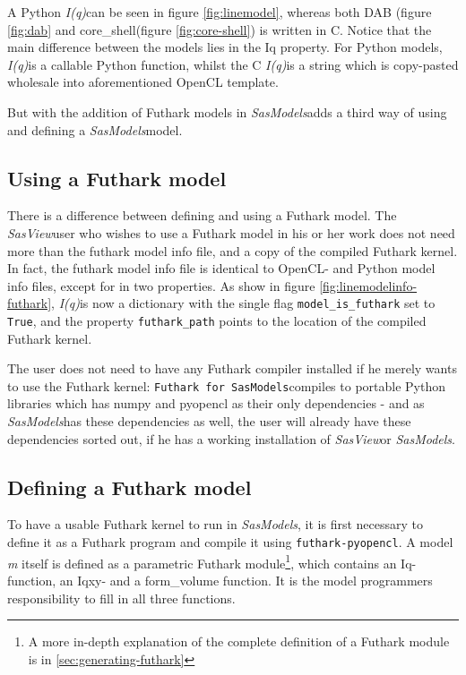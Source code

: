 \documentclass[11pt]{article}
\newcommand{\sasmodels}{\textit{SasModels}}
\newcommand{\sasview}{\textit{SasView}}
\newcommand{\iq}{\textit{I(q)}}
\newcommand{\futhark}{\texttt{Futhark for SasModels}}
\begin{document}
A Python \iq can be seen in figure \ref{fig:linemodel}, whereas both DAB (figure
\ref{fig:dab} and core\_shell(figure \ref{fig:core-shell}) is written in C.
Notice that the main difference between the models lies in the Iq property.
For Python models, \iq is a callable Python function, whilst the C \iq is a
 string which is copy-pasted wholesale into aforementioned OpenCL template.

But with the addition of Futhark models in \sasmodels adds a third way of
using and defining a \sasmodels model.

\subsection{Using a Futhark model}
\label{sec:using-futhark}
There is a difference between defining and using a Futhark model.
The \sasview user who wishes to use a Futhark model in his or her work does 
not need more than the futhark model info file, and a copy of the compiled
Futhark kernel. In fact, the futhark model info file is identical to OpenCL- 
and Python model info files, except for in two properties.
As show in figure \ref{fig:linemodelinfo-futhark}, \iq is now a dictionary
with the single flag \texttt{model\_is\_futhark} set to \texttt{True},
and the property \texttt{futhark\_path} points to the location of the compiled
Futhark kernel.

The user does not need to have any Futhark compiler installed if he merely wants
to use the Futhark kernel: \futhark compiles to portable Python libraries which 
has numpy and pyopencl as their only dependencies - and as \sasmodels has these 
dependencies as well, the user will already have these dependencies sorted out, 
if he has a working installation of \sasview or \sasmodels.

\subsection{Defining a Futhark model}
\label{sec:defining-futhark-model}
To have a usable Futhark kernel to run in \sasmodels, it is first necessary to
define it as a Futhark program and compile it using \texttt{futhark-pyopencl}.
A model \textit{m} itself is defined as a parametric Futhark module\footnote{
  A more in-depth explanation of the complete definition of a Futhark module is 
  in \ref{sec:generating-futhark}},
which contains an Iq-function, an Iqxy- and a form\_volume function.
It is the model programmers responsibility to fill in all three functions.
\end{document}
